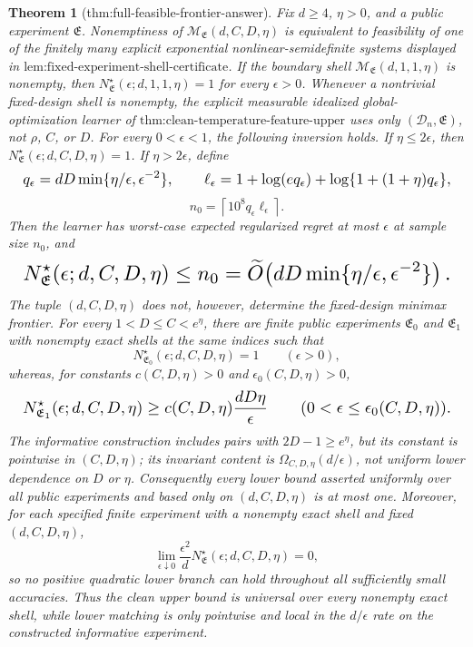 \documentclass{article}
\newtheorem{theorem}{Theorem}
\begin{document}
\begin{theorem}[thm:full-feasible-frontier-answer]\label{thm:full-feasible-frontier-answer}
Fix \(d\ge4\), \(\eta>0\), and a public experiment \(\mathfrak E\). Nonemptiness of \(\mathcal M_{\mathfrak E}(d,C,D,\eta)\) is equivalent to feasibility of one of the finitely many explicit exponential nonlinear-semidefinite systems displayed in \(\text{lem:fixed-experiment-shell-certificate}\). If the boundary shell \(\mathcal M_{\mathfrak E}(d,1,1,\eta)\) is nonempty, then \(N^\star_{\mathfrak E}(\epsilon;d,1,1,\eta)=1\) for every \(\epsilon>0\). Whenever a nontrivial fixed-design shell is nonempty, the explicit measurable idealized global-optimization learner of \(\text{thm:clean-temperature-feature-upper}\) uses only \((\mathcal D_n,\mathfrak E)\), not \(\rho\), \(C\), or \(D\). For every \(0<\epsilon<1\), the following inversion holds. If \(\eta\le2\epsilon\), then \(N^\star_{\mathfrak E}(\epsilon;d,C,D,\eta)=1\). If \(\eta>2\epsilon\), define
\[
\makebox[\linewidth][c]{\resizebox{0.98\linewidth}{!}{\(\displaystyle q_\epsilon=dD\min\{\eta/\epsilon,\epsilon^{-2}\},
\qquad
\ell_\epsilon=1+\log(eq_\epsilon)+\log\{1+(1+\eta)q_\epsilon\},\)}}
\]
\[
n_0=\left\lceil10^8q_\epsilon\ell_\epsilon\right\rceil.
\]
Then the learner has worst-case expected regularized regret at most \(\epsilon\) at sample size \(n_0\), and
\[
\makebox[\linewidth][c]{\resizebox{0.98\linewidth}{!}{\(\displaystyle N^\star_{\mathfrak E}(\epsilon;d,C,D,\eta)\le n_0
=\widetilde O\!\left(dD\min\{\eta/\epsilon,\epsilon^{-2}\}\right).\)}}
\]
The tuple \((d,C,D,\eta)\) does not, however, determine the fixed-design minimax frontier. For every \(1<D\le C<e^\eta\), there are finite public experiments \(\mathfrak E_0\) and \(\mathfrak E_1\) with nonempty exact shells at the same indices such that
\[
N^\star_{\mathfrak E_0}(\epsilon;d,C,D,\eta)=1\qquad(\epsilon>0),
\]
whereas, for constants \(c(C,D,\eta)>0\) and \(\epsilon_0(C,D,\eta)>0\),
\[
\makebox[\linewidth][c]{\resizebox{0.98\linewidth}{!}{\(\displaystyle N^\star_{\mathfrak E_1}(\epsilon;d,C,D,\eta)\ge c(C,D,\eta)\frac{dD\eta}{\epsilon}
\qquad(0<\epsilon\le\epsilon_0(C,D,\eta)).\)}}
\]
The informative construction includes pairs with \(2D-1\ge e^\eta\), but its constant is pointwise in \((C,D,\eta)\); its invariant content is \(\Omega_{C,D,\eta}(d/\epsilon)\), not uniform lower dependence on \(D\) or \(\eta\). Consequently every lower bound asserted uniformly over all public experiments and based only on \((d,C,D,\eta)\) is at most one. Moreover, for each specified finite experiment with a nonempty exact shell and fixed \((d,C,D,\eta)\),
\[
\lim_{\epsilon\downarrow0}\frac{\epsilon^2}{d}N^\star_{\mathfrak E}(\epsilon;d,C,D,\eta)=0,
\]
so no positive quadratic lower branch can hold throughout all sufficiently small accuracies. Thus the clean upper bound is universal over every nonempty exact shell, while lower matching is only pointwise and local in the \(d/\epsilon\) rate on the constructed informative experiment.
\end{theorem}
\end{document}
